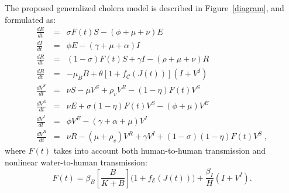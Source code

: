 The proposed generalized cholera model is described in Figure~\ref{diagram}, and formulated as:
\begin{eqnarray} \label{eq:fullmodel}
 \frac{dE}{dt} &=& \sigma F(t) S - (\phi + \mu +\nu) E \label{eq:E2}\\
 \frac{dI}{dt} &=& \phi E - (\gamma + \mu + \alpha) I \label{eq:I2}\\
 \frac{dR}{dt} &=& (1-\sigma) F(t) S + \gamma I - (\rho + \mu+\nu) R \label{eq:R2}\\
 \frac{dB}{dt} &=& - \mu_B B +\theta\left[1 + f_{\mathcal{C}}\left( J(t)\right) \right] (I+V^I) \label{eq:B2}\\
\frac{dV^S}{dt} &=& \nu S - \mu V^S+ \rho_{v} V^R - (1-\eta) F(t) V^S \label{eq:VS2}\\
 \frac{dV^E}{dt} &=& \nu E + \sigma (1-\eta) F(t) V^S-(\phi + \mu) V^E \label{eq:VE2}\\
 \frac{dV^I}{dt} &=&  \phi V^E -(\gamma + \alpha + \mu) V^I \label{eq:VI2}\\
 \frac{dV^R}{dt} &=& \nu R -(\mu +\rho_{v})V^R +\gamma V^I +(1-\sigma) (1-\eta) F(t) V^S\label{eq:VR2}\; ,
\end{eqnarray}
where $F(t)$ takes into account both human-to-human transmission and nonlinear water-to-human transmission:
\begin{equation}
  F(t) = \beta_B \left[\frac{B}{K + B} \right] \bigg(1+f_{\mathcal{E}}\left(J(t)\right)\bigg) + \frac{\beta_{I}}{H} (I+V^I).
\label{eq:force2}
\end{equation}

